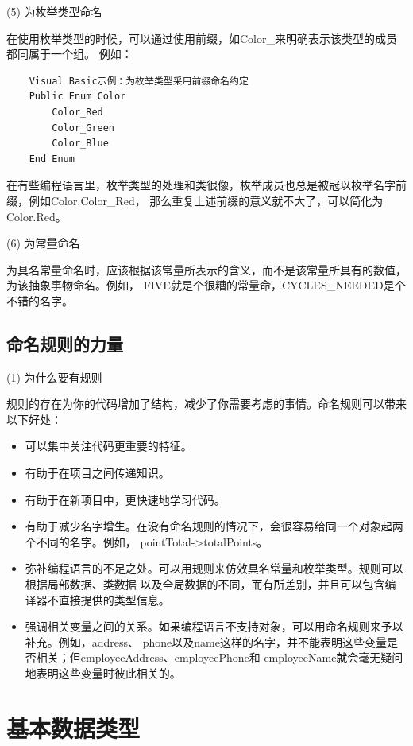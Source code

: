 \documentclass{article}
\begin{document}
\par
(5) 为枚举类型命名
\par
在使用枚举类型的时候，可以通过使用前缀，如Color\_来明确表示该类型的成员都同属于一个组。
例如：
\begin{lstlisting}
    Visual Basic示例：为枚举类型采用前缀命名约定
    Public Enum Color
        Color_Red
        Color_Green
        Color_Blue
    End Enum
\end{lstlisting}
在有些编程语言里，枚举类型的处理和类很像，枚举成员也总是被冠以枚举名字前缀，例如Color.Color\_Red，
那么重复上述前缀的意义就不大了，可以简化为Color.Red。

\par
(6) 为常量命名
\par
为具名常量命名时，应该根据该常量所表示的含义，而不是该常量所具有的数值，为该抽象事物命名。例如，
FIVE就是个很糟的常量命，CYCLES\_NEEDED是个不错的名字。

\subsection{命名规则的力量}
\par
(1) 为什么要有规则
\par
规则的存在为你的代码增加了结构，减少了你需要考虑的事情。命名规则可以带来以下好处：
\begin{itemize}
    \item 可以集中关注代码更重要的特征。
    \item 有助于在项目之间传递知识。
    \item 有助于在新项目中，更快速地学习代码。
    \item 有助于减少名字增生。在没有命名规则的情况下，会很容易给同一个对象起两个不同的名字。例如，
    pointTotal->totalPoints。
    \item 弥补编程语言的不足之处。可以用规则来仿效具名常量和枚举类型。规则可以根据局部数据、类数据
    以及全局数据的不同，而有所差别，并且可以包含编译器不直接提供的类型信息。
    \item 强调相关变量之间的关系。如果编程语言不支持对象，可以用命名规则来予以补充。例如，address、
    phone以及name这样的名字，并不能表明这些变量是否相关；但employeeAddress、employeePhone和
    employeeName就会毫无疑问地表明这些变量时彼此相关的。
\end{itemize}



\section{基本数据类型}
\end{document}
